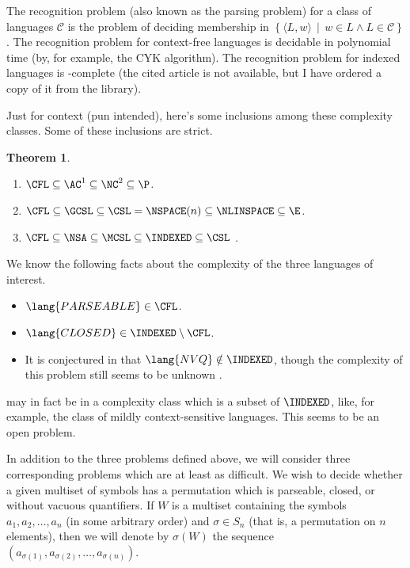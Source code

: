 \documentclass{article}
\newtheorem{theorem}{Theorem}
\theoremstyle{remark} \newtheorem{technicality}{Technical note}
\theoremstyle{definition} \newtheorem{definition}{Definition}
\newcommand{\pair}[2]{\langle#1,#2\rangle} %
\newcommand{\lb}{\left\{} %
\newcommand{\rb}{\right\}} %
\newcommand{\st}{\,\middle|\,} %
\begin{document}
The recognition problem (also known as the parsing problem) for a class of languages $\mathcal{C}$ is the problem of deciding membership in $\lb\pair{L}{w}\st w\in L \land L\in\mathcal{C} \rb$.
The recognition problem for context-free languages is decidable in polynomial time (by, for example, the CYK algorithm).
The recognition problem for indexed languages is \EXP-complete \cite{tk86} (the cited article is not available, but I have ordered a copy of it from the library).

Just for context (pun intended), here's some inclusions among these complexity classes.
Some of these inclusions are strict.
\begin{theorem}\mbox{}
  \begin{enumerate}
  \item $\CFL\subseteq\AC^1\subseteq\NC^2\subseteq\P$.
  \item $\CFL\subseteq\GCSL\subseteq\CSL=\NSPACE(n)\subseteq\NLINSPACE\subseteq\E$.
  \item $\CFL\subseteq\NSA\subseteq\MCSL\subseteq\INDEXED\subseteq\CSL$ \cite{hu79}.
  \end{enumerate}
\end{theorem}

We know the following facts about the complexity of the three languages of interest.
\begin{itemize}
\item $\lang{PARSEABLE}\in\CFL$.
\item $\lang{CLOSED}\in\INDEXED\setminus\CFL$. \cite{mp84}
\item It is conjectured in \cite{mp84} that $\lang{NVQ}\notin\INDEXED$, though the complexity of this problem still seems to be unknown \cite{potts}.
\end{itemize}
 may in fact be in a complexity class which is a subset of $\INDEXED$, like, for example, the class of mildly context-sensitive languages.
This seems to be an open problem.

In addition to the three problems defined above, we will consider three corresponding problems which are at least as difficult.
We wish to decide whether a given multiset of symbols has a permutation which is parseable, closed, or without vacuous quantifiers.
If $W$ is a multiset containing the symbols $a_1, a_2, \ldots, a_n$ (in some arbitrary order) and $\sigma\in S_n$ (that is, a permutation on $n$ elements), then we will denote by $\sigma(W)$ the sequence $(a_{\sigma(1)}, a_{\sigma(2)}, \ldots, a_{\sigma(n)})$.
\end{document}
